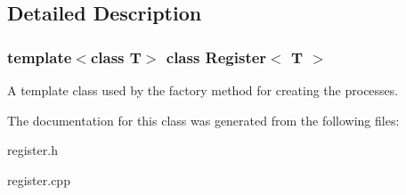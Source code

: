 \subsection{Detailed Description}
\subsubsection*{template$<$class T$>$\newline
class Register$<$ T $>$}

A template class used by the factory method for creating the processes. 

The documentation for this class was generated from the following files\+:\begin{DoxyCompactItemize}
\item 
register.\+h\item 
register.\+cpp\end{DoxyCompactItemize}
